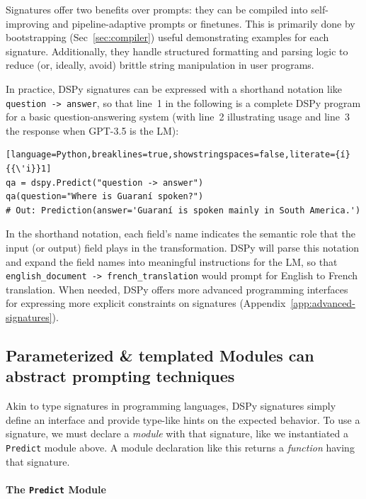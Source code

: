 Signatures offer two benefits over prompts: they can be compiled into self-improving and pipeline-adaptive prompts or finetunes. This is primarily done by bootstrapping (Sec~\ref{sec:compiler}) useful demonstrating examples for each signature. Additionally, they handle structured formatting and parsing logic to reduce (or, ideally, avoid) brittle string manipulation in user programs.


\newcommand{\dspyarrow}{->}

In practice, DSPy signatures can be expressed with a shorthand notation like \texttt{question \dspyarrow\ answer}, so that line~1 in the following is a complete DSPy program for a basic question-answering system (with line~2 illustrating usage and line~3 the response when GPT-3.5 is the LM):

\begin{samepage}
\begin{lstlisting}[language=Python,breaklines=true,showstringspaces=false,literate={í}{{\'i}}1]
qa = dspy.Predict("question -> answer")
qa(question="Where is Guaraní spoken?")
# Out: Prediction(answer='Guaraní is spoken mainly in South America.')
\end{lstlisting}
\end{samepage}
In the shorthand notation, each field's name indicates the semantic role that the input (or output) field plays in the transformation. DSPy will parse this notation and expand the field names into meaningful instructions for the LM, so that \texttt{english\_document \dspyarrow\ french\_translation} would prompt for English to French translation. When needed, DSPy offers more advanced programming interfaces for expressing more explicit constraints on signatures (Appendix~\ref{app:advanced-signatures}).


\subsection{Parameterized \& templated Modules can abstract prompting techniques}\label{sec:modules}

Akin to type signatures in programming languages, DSPy signatures simply define an interface and provide type-like hints on the expected behavior. To use a signature, we must declare a \emph{module} with that signature, like we instantiated a \texttt{Predict} module above. A module declaration like this returns a \textit{function} having that signature.

\paragraph{The \texttt{Predict} Module}

